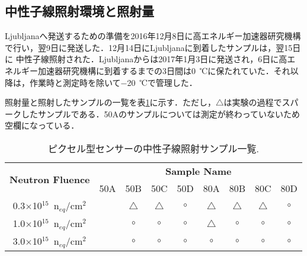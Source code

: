 \subsection{中性子線照射環境と照射量}
Ljubljanaへ発送するための準備を2016年12月8日に高エネルギー加速器研究機構で行い，翌9日に発送した．12月14日にLjubljanaに到着したサンプルは，翌15日に
中性子線照射された．Ljubljanaからは2017年1月3日に発送され，6日に高エネルギー加速器研究機構に到着するまでの3日間は0~℃に保たれていた．それ以降は，作業時と測定時を除いて$-$20~℃で管理した．\par
照射量と照射したサンプルの一覧を表\ref{tab:neusam}に示す．ただし，{\scriptsize$\triangle$}は実験の過程でスパークしたサンプルである．50Aのサンプルについては測定が終わっていないため空欄になっている．
\begin{table}[H]
	\centering
	\caption{ピクセル型センサーの中性子線照射サンプル一覧.}
	\vspace{5truemm}
	\begin{tabular}{|c||c|c|c|c|c|c|c|c|}\hline
	\multirow{2}{*}{\textbf{Neutron Fluence}}& \multicolumn{8}{|c|}{\textbf{Sample Name}}\\ \cline{2-9}
	&50A &50B &50C &50D &80A &80B &80C &80D\\ \cline{2-9}
	\hline\hline
	0.3$\times$10$^{15}$~n$_{eq}$/cm$^{2}$& & {\scriptsize$\triangle$}& {\scriptsize$\triangle$}& $\circ$& {\scriptsize$\triangle$}& {\scriptsize$\triangle$}& {\scriptsize$\triangle$}& $\circ$\\
	\hline
	1.0$\times$10$^{15}$~n$_{eq}$/cm$^{2}$& & $\circ$& $\circ$& $\circ$& {\scriptsize$\triangle$}& $\circ$& $\circ$& $\circ$\\
	\hline
	3.0$\times$10$^{15}$~n$_{eq}$/cm$^{2}$& & $\circ$& $\circ$& $\circ$& $\circ$& $\circ$& $\circ$& $\circ$\\
	\hline
	\end{tabular}
	\label{tab:neusam}
\end{table}
